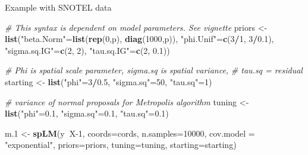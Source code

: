 \documentclass[
  ignorenonframetext,
]{beamer}
\newenvironment{Shaded}{\begin{snugshade}}{\end{snugshade}}
\newcommand{\CommentTok}[1]{\textcolor[rgb]{0.56,0.35,0.01}{\textit{#1}}}
\newcommand{\DataTypeTok}[1]{\textcolor[rgb]{0.13,0.29,0.53}{#1}}
\newcommand{\DecValTok}[1]{\textcolor[rgb]{0.00,0.00,0.81}{#1}}
\newcommand{\FloatTok}[1]{\textcolor[rgb]{0.00,0.00,0.81}{#1}}
\newcommand{\KeywordTok}[1]{\textcolor[rgb]{0.13,0.29,0.53}{\textbf{#1}}}
\newcommand{\NormalTok}[1]{#1}
\newcommand{\OperatorTok}[1]{\textcolor[rgb]{0.81,0.36,0.00}{\textbf{#1}}}
\newcommand{\StringTok}[1]{\textcolor[rgb]{0.31,0.60,0.02}{#1}}
\begin{document}
\begin{frame}[fragile]{Example with SNOTEL data}
\protect\hypertarget{example-with-snotel-data-1}{}

\begin{Shaded}
\begin{Highlighting}[]
\CommentTok{# This syntax is dependent on model parameters. See vignette}
\NormalTok{priors <-}\StringTok{ }\KeywordTok{list}\NormalTok{(}\StringTok{"beta.Norm"}\NormalTok{=}\KeywordTok{list}\NormalTok{(}\KeywordTok{rep}\NormalTok{(}\DecValTok{0}\NormalTok{,p), }
  \KeywordTok{diag}\NormalTok{(}\DecValTok{1000}\NormalTok{,p)), }\StringTok{"phi.Unif"}\NormalTok{=}\KeywordTok{c}\NormalTok{(}\DecValTok{3}\OperatorTok{/}\DecValTok{1}\NormalTok{, }\DecValTok{3}\OperatorTok{/}\FloatTok{0.1}\NormalTok{), }
  \StringTok{"sigma.sq.IG"}\NormalTok{=}\KeywordTok{c}\NormalTok{(}\DecValTok{2}\NormalTok{, }\DecValTok{2}\NormalTok{), }\StringTok{"tau.sq.IG"}\NormalTok{=}\KeywordTok{c}\NormalTok{(}\DecValTok{2}\NormalTok{, }\FloatTok{0.1}\NormalTok{))}

\CommentTok{# Phi is spatial scale parameter, sigma.sq is spatial variance, }
\CommentTok{# tau.sq = residual}
\NormalTok{starting <-}\StringTok{ }\KeywordTok{list}\NormalTok{(}\StringTok{"phi"}\NormalTok{=}\DecValTok{3}\OperatorTok{/}\FloatTok{0.5}\NormalTok{, }\StringTok{"sigma.sq"}\NormalTok{=}\DecValTok{50}\NormalTok{, }\StringTok{"tau.sq"}\NormalTok{=}\DecValTok{1}\NormalTok{)}

\CommentTok{# variance of normal proposals for Metropolis algorithm}
\NormalTok{tuning <-}\StringTok{ }\KeywordTok{list}\NormalTok{(}\StringTok{"phi"}\NormalTok{=}\FloatTok{0.1}\NormalTok{, }\StringTok{"sigma.sq"}\NormalTok{=}\FloatTok{0.1}\NormalTok{, }\StringTok{"tau.sq"}\NormalTok{=}\FloatTok{0.1}\NormalTok{)}

\NormalTok{m}\FloatTok{.1}\NormalTok{ <-}\StringTok{ }\KeywordTok{spLM}\NormalTok{(y}\OperatorTok{~}\NormalTok{X}\DecValTok{-1}\NormalTok{, }\DataTypeTok{coords=}\NormalTok{cords, }
  \DataTypeTok{n.samples=}\DecValTok{10000}\NormalTok{, }
  \DataTypeTok{cov.model =} \StringTok{"exponential"}\NormalTok{, }\DataTypeTok{priors=}\NormalTok{priors, }
  \DataTypeTok{tuning=}\NormalTok{tuning, }\DataTypeTok{starting=}\NormalTok{starting)}
\end{Highlighting}
\end{Shaded}

\end{frame}
\end{document}
